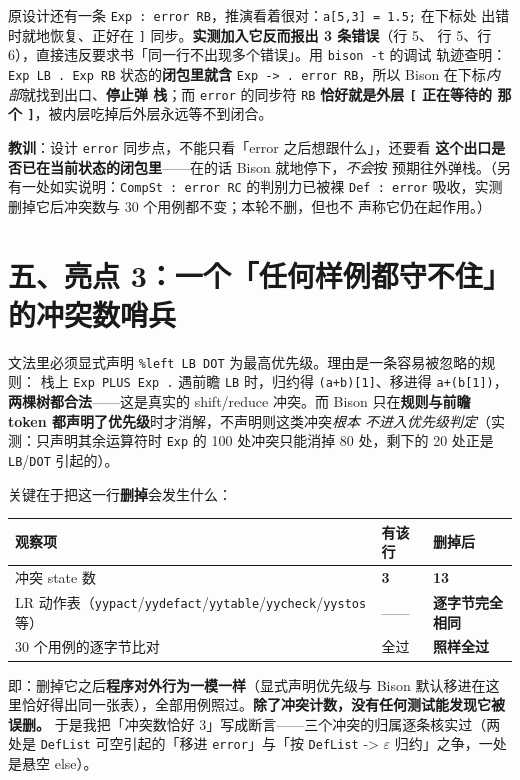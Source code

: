 \documentclass[11pt,a4paper]{ctexart}
\newcommand{\code}[1]{\texttt{#1}}
\begin{document}
原设计还有一条 \code{Exp : error RB}，推演看着很对：\code{a[5,3] = 1.5;} 在下标处
出错时就地恢复、正好在 \code{]} 同步。\textbf{实测加入它反而报出 3 条错误}（行 5、
行 5、行 6），直接违反要求书「同一行不出现多个错误」。用 \code{bison -t} 的调试
轨迹查明：\code{Exp LB . Exp RB} 状态的\textbf{闭包里就含}
\code{Exp -> . error RB}，所以 Bison 在下标\emph{内部}就找到出口、\textbf{停止弹
栈}；而 \code{error} 的同步符 \code{RB} \textbf{恰好就是外层 \code{[} 正在等待的
那个 \code{]}}，被内层吃掉后外层永远等不到闭合。

\textbf{教训}：设计 \code{error} 同步点，不能只看「error 之后想跟什么」，还要看
\textbf{这个出口是否已在当前状态的闭包里}——在的话 Bison 就地停下，\emph{不会}按
预期往外弹栈。（另有一处如实说明：\code{CompSt : error RC} 的判别力已被裸
\code{Def : error} 吸收，实测删掉它后冲突数与 30 个用例都不变；本轮不删，但也不
声称它仍在起作用。）

\section*{五、亮点 3：一个「任何样例都守不住」的冲突数哨兵}

文法里必须显式声明 \code{\%left LB DOT} 为最高优先级。理由是一条容易被忽略的规则：
栈上 \code{Exp PLUS Exp .} 遇前瞻 \code{LB} 时，归约得 \code{(a+b)[1]}、移进得
\code{a+(b[1])}，\textbf{两棵树都合法}——这是真实的 shift/reduce 冲突。而 Bison
只在\textbf{规则与前瞻 token 都声明了优先级}时才消解，不声明则这类冲突\emph{根本
不进入优先级判定}（实测：只声明其余运算符时 \code{Exp} 的 100 处冲突只能消掉 80
处，剩下的 20 处正是 \code{LB}/\code{DOT} 引起的）。

关键在于把这一行\textbf{删掉}会发生什么：

{\small
\begin{tabular}{@{}lll@{}}
\toprule
观察项 & 有该行 & 删掉后 \\
\midrule
冲突 state 数 & \textbf{3} & \textbf{13} \\
LR 动作表（\code{yypact}/\code{yydefact}/\code{yytable}/\code{yycheck}/\code{yystos} 等） & —— & \textbf{逐字节完全相同} \\
30 个用例的逐字节比对 & 全过 & \textbf{照样全过} \\
\bottomrule
\end{tabular}}

即：删掉它之后\textbf{程序对外行为一模一样}（显式声明优先级与 Bison 默认移进在这
里恰好得出同一张表），全部用例照过。\textbf{除了冲突计数，没有任何测试能发现它被
误删。} 于是我把「冲突数恰好 3」写成断言——三个冲突的归属逐条核实过（两处是
\code{DefList} 可空引起的「移进 \code{error}」与「按 \code{DefList} ->
$\varepsilon$ 归约」之争，一处是悬空 else）。
\end{document}
